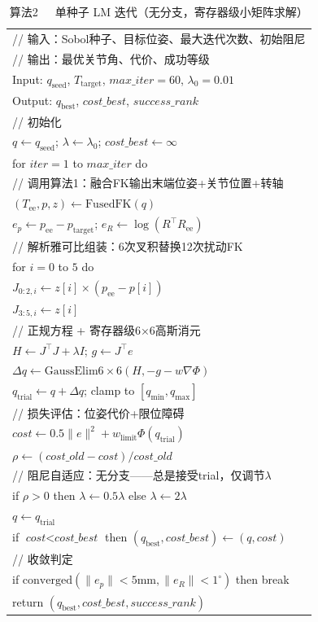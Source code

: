 \documentclass[twocolumn,a4paper,10pt]{ctexart}
\makeatletter
\newenvironment{algotable}[2]{%
  \begin{table}[htbp]
  \centering
  \caption{#2}
  \label{#1}
  \footnotesize\ttfamily
  \begin{tabular}{@{}p{\columnwidth}@{}}
  \toprule
}{%
  \\\bottomrule
  \end{tabular}
  \end{table}
}
\makeatother
\begin{document}
\begin{algotable}{alg:lm}{算法2~~~单种子 LM 迭代（无分支，寄存器级小矩阵求解）}
// 输入：Sobol种子、目标位姿、最大迭代次数、初始阻尼\\
// 输出：最优关节角、代价、成功等级\\
Input: $q_{\mathrm{seed}}$, $T_{\mathrm{target}}$, $\textit{max\_iter}{=}60$, $\lambda_0{=}0.01$\\
Output: $q_{\mathrm{best}}$, $\textit{cost\_best}$, $\textit{success\_rank}$\\[2pt]
// 初始化\\
\quad $q\leftarrow q_{\mathrm{seed}}$; $\lambda\leftarrow\lambda_0$; $\textit{cost\_best}\leftarrow\infty$\\
\quad for $\textit{iter}=1$ to $\textit{max\_iter}$ do\\
// 调用算法1：融合FK输出末端位姿+关节位置+转轴\\
\qquad $(T_{\mathrm{ee}},p,z)\leftarrow\mathrm{FusedFK}(q)$\\
\qquad $e_p\leftarrow p_{\mathrm{ee}}-p_{\mathrm{target}}$; $e_R\leftarrow\log(R^\top R_{\mathrm{ee}})$\\
// 解析雅可比组装：6次叉积替换12次扰动FK\\
\qquad for $i=0$ to $5$ do\\
\qquad\quad $J_{0:2,i}\leftarrow z[i]\times(p_{\mathrm{ee}}-p[i])$\\
\qquad\quad $J_{3:5,i}\leftarrow z[i]$\\
// 正规方程 + 寄存器级6×6高斯消元\\
\qquad $H\leftarrow J^\top J+\lambda I$; $g\leftarrow J^\top e$\\
\qquad $\Delta q\leftarrow\mathrm{GaussElim6\times6}(H,-g-w\nabla\Phi)$\\
\qquad $q_{\mathrm{trial}}\leftarrow q+\Delta q$; clamp to $[q_{\min},q_{\max}]$\\
// 损失评估：位姿代价+限位障碍\\
\qquad $\textit{cost}\leftarrow0.5\|e\|^2+w_{\mathrm{limit}}\Phi(q_{\mathrm{trial}})$\\
\qquad $\rho\leftarrow(\textit{cost\_old}-\textit{cost})/\textit{cost\_old}$\\
// 阻尼自适应：无分支——总是接受trial，仅调节$\lambda$\\
\qquad if $\rho>0$ then $\lambda\leftarrow0.5\lambda$ else $\lambda\leftarrow2\lambda$\\
\qquad $q\leftarrow q_{\mathrm{trial}}$\\
\qquad if $\textit{cost}<\textit{cost\_best}$ then $(q_{\mathrm{best}},\textit{cost\_best})\leftarrow(q,\textit{cost})$\\
// 收敛判定\\
\qquad if $\mathrm{converged}(\|e_p\|{<}5\mathrm{mm},\|e_R\|{<}1^\circ)$ then break\\
\quad return $(q_{\mathrm{best}},\textit{cost\_best},\textit{success\_rank})$
\end{algotable}
\end{document}

